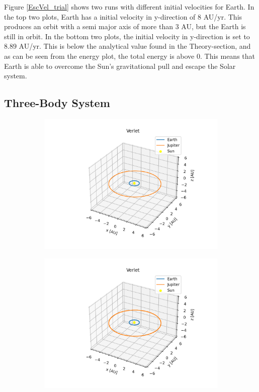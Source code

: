 	Figure \ref{EscVel_trial} shows two runs with different initial velocities for Earth. In the top two plots, Earth has a initial velocity in y-direction of $8$ AU/yr. This produces an orbit with a semi major axis of more than 3 AU, but the Earth is still in orbit. In the bottom two plots, the initial velocity in y-direction is set to $8.89$ AU/yr. This is below the analytical value found in the Theory-section, and as can be seen from the energy plot, the total energy is above 0. This means that Earth is able to overcome the Sun's gravitational pull and escape the Solar system.
	
	\subsection{Three-Body System}

	\begin{figure}[h!]
		\centering
		\begin{subfigure}{0.48\linewidth}
			\includegraphics[width=1.2\linewidth]{Figure/threebodynormalmass.png}
		\end{subfigure}
		\begin{subfigure}{0.48\linewidth}
			\includegraphics[width=1.15\linewidth]{Figure/threebodynormalmass120.png}

\end{subfigure}
\end{figure}
